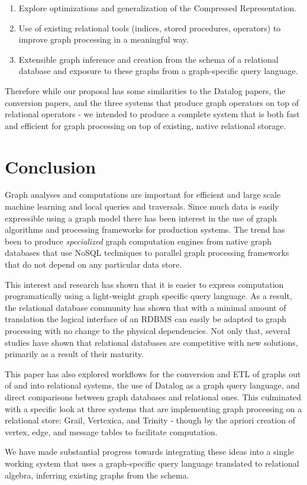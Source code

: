 \documentclass[11pt,letterpaper]{article}
\begin{document}
\begin{enumerate}
	\item Explore optimizations and generalization of the Compressed Representation.
	\item Use of existing relational tools (indices, stored procedures, operators) to improve graph processing in a meaningful way.
	\item Extensible graph inference and creation from the schema of a relational database and exposure to these graphs from a graph-specific query language.
\end{enumerate}

Therefore while our proposal has some similarities to the Datalog papers, the conversion papers, and the three systems that produce graph operators on top of relational operators - we intended to produce a complete system that is both fast and efficient for graph processing on top of existing, native relational storage.

\section*{Conclusion}

Graph analyses and computations are important for efficient and large scale machine learning and local queries and traversals. Since much data is easily expressible using a graph model there has been interest in the use of graph algorithms and processing frameworks for production systems. The trend has been to produce \textit{specialized} graph computation engines from native graph databases that use NoSQL techniques to parallel graph processing frameworks that do not depend on any particular data store.

This interest and research has shown that it is easier to express computation programatically using a light-weight graph specific query language. As a result, the relational database community has shown that with a minimal amount of translation the logical interface of an RDBMS can easily be adapted to graph processing with no change to the physical dependencies. Not only that, several studies have shown that relational databases are competitive with new solutions, primarily as a result of their maturity.

This paper has also explored workflows for the conversion and ETL of graphs out of and into relational systems, the use of Datalog as a graph query language, and direct comparisons between graph databases and relational ones. This culminated with a specific look at three systems that are implementing graph processing on a relational store: Grail, Vertexica, and Trinity - though by the apriori creation of vertex, edge, and message tables to facilitate computation.

We have made substantial progress towards integrating these ideas into a single working system that uses a graph-specific query language translated to relational algebra, inferring existing graphs from the schema.



\end{document}
